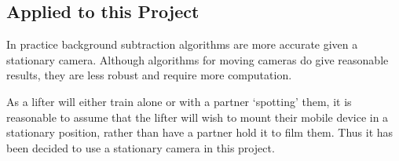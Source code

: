 \subsection{Applied to this Project}

In practice background subtraction algorithms are more accurate given a stationary camera. Although algorithms for moving cameras do give reasonable results, they are less robust and require more computation.

As a lifter will either train alone or with a partner `spotting' them, it is reasonable to assume that the lifter will wish to mount their mobile device in a stationary position, rather than have a partner hold it to film them. Thus it has been decided to use a stationary camera in this project. 